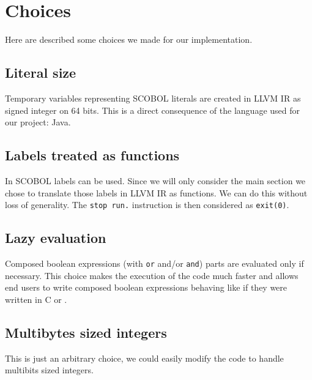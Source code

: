 \section{Choices}

Here are described some choices we made for our implementation.


\subsection{Literal size}

Temporary variables representing SCOBOL literals are created in LLVM IR as signed integer on 64 bits. This is a direct consequence of the language used for our project: Java.


\subsection{Labels treated as functions}

In SCOBOL labels can be used. Since we will only consider the main section we chose to translate those labels in LLVM IR as functions. We can do this without loss of generality. The \verb!stop run.! instruction is then considered as \verb!exit(0)!.

\subsection{Lazy evaluation}

Composed boolean expressions (with \verb!or! and/or \verb!and!) parts are evaluated only if necessary. This choice makes the execution of the code much faster and allows end users to write composed boolean expressions behaving like if they were written in C or \CXX.

\subsection{Multibytes sized integers}

This is just an arbitrary choice, we could easily modify the code to handle multibits sized integers.



